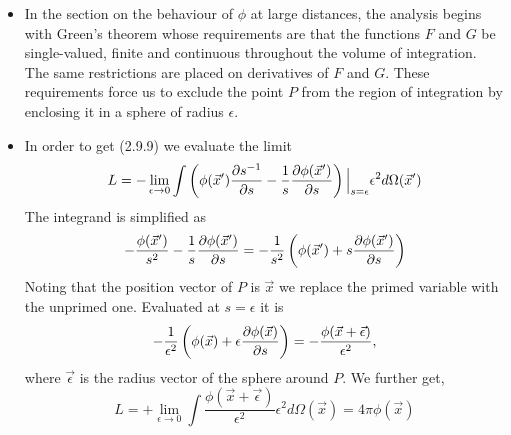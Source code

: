 \begin{itemize}
\item In the section on the behaviour of $\phi$ at large distances, the analysis begins with Green's theorem whose requirements are that the functions $F$ and $G$ be single-valued, finite
and continuous throughout the volume of integration. The same restrictions are placed on derivatives of $F$ and $G$. These requirements force us to exclude the point $P$ from the region
of integration by enclosing it in a sphere of radius $\epsilon$.

\item In order to get (2.9.9) we evaluate the limit
\[
L = -\lim_{\epsilon \rightarrow 0}\int \left(\phi(\vec{x}^\prime)\frac{\partial{s^{-1}}}{\partial{s}} - \frac{1}{s}\frac{\partial{\phi(\vec{x}^\prime)}}{\partial{s}}\right)\Big|_{s = \epsilon} \epsilon^2 d\Omega(\vec{x}^\prime)
\]
The integrand is simplified as
\[
-\frac{\phi(\vec{x}^\prime)}{s^2} - \frac{1}{s}\frac{\partial{\phi(\vec{x}^\prime)}}{\partial{s}} = -\frac{1}{s^2}\left(\phi(\vec{x}^\prime) + s\frac{\partial{\phi(\vec{x}^\prime)}}{\partial{s}}\right)
\]
Noting that the position vector of $P$ is $\vec{x}$ we replace the primed variable with the unprimed one. Evaluated at $s = \epsilon$ it is
\[
-\frac{1}{\epsilon^2}\left(\phi(\vec{x}) + \epsilon\frac{\partial{\phi(\vec{x})}}{\partial{s}}\right) = -\frac{\phi(\vec{x} + \vec{\epsilon})}{\epsilon^2},
\]
where $\vec{\epsilon}$ is the radius vector of the sphere around $P$. We further get,
\[
L = +\lim_{\epsilon \rightarrow 0}\int\frac{\phi(\vec{x} + \vec{\epsilon})}{\epsilon^2}\epsilon^2 d\Omega(\vec{x}) = 4\pi\phi(\vec{x})
\]


\end{itemize}
